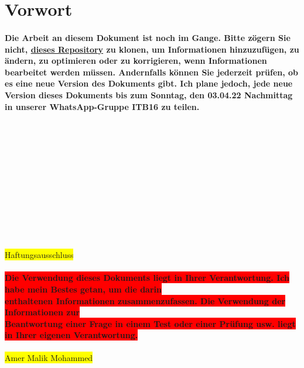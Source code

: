\documentclass[a4paper]{article}
\begin{document}
    \begin{titlepage}
        
    \end{titlepage}

    

    \section{Vorwort}\label{sec:einführung}
    \paragraph{Die Arbeit an diesem Dokument ist noch im Gange. Bitte zögern Sie nicht, \href{https://github.com/amermmohammed/LF2_Klausurvorbereitung}{dieses Repository} zu klonen, um Informationen hinzuzufügen, zu ändern, zu optimieren oder zu korrigieren, wenn Informationen bearbeitet werden müssen. Andernfalls können Sie jederzeit prüfen, ob es eine neue Version des Dokuments gibt. Ich plane jedoch, jede neue Version dieses Dokuments bis zum Sonntag, den 03.04.22 Nachmittag in unserer WhatsApp-Gruppe ITB16 zu teilen.}
    \paragraph{\\\\\\\\\\\\\\\\\\\\}
    \begin{center}
        
        \color{red}
        \colorbox{yellow}{Haftungsausschluss}
    \end{center}
    \paragraph{\color{white} \centering\colorbox{red}{Die Verwendung dieses Dokuments liegt in Ihrer Verantwortung. Ich habe mein Bestes getan, um die darin} \\\colorbox{red}{enthaltenen Informationen zusammenzufassen. Die Verwendung der Informationen zur } \\\hspace{1cm}\colorbox{red}{Beantwortung einer Frage in einem Test oder einer Prüfung usw. liegt in Ihrer eigenen Verantwortung.}}
    \begin{center}
        \color{red}
        \colorbox{yellow}{Amer Malik Mohammed}
    \end{center}
    \newpage
    \tableofcontents
    \newpage
    
\end{document}
